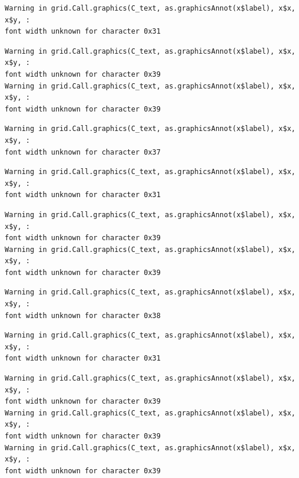 \documentclass[
  letterpaper,
]{scrbook}
\begin{document}
\begin{verbatim}
Warning in grid.Call.graphics(C_text, as.graphicsAnnot(x$label), x$x, x$y, :
font width unknown for character 0x31
\end{verbatim}

\begin{verbatim}
Warning in grid.Call.graphics(C_text, as.graphicsAnnot(x$label), x$x, x$y, :
font width unknown for character 0x39
Warning in grid.Call.graphics(C_text, as.graphicsAnnot(x$label), x$x, x$y, :
font width unknown for character 0x39
\end{verbatim}

\begin{verbatim}
Warning in grid.Call.graphics(C_text, as.graphicsAnnot(x$label), x$x, x$y, :
font width unknown for character 0x37
\end{verbatim}

\begin{verbatim}
Warning in grid.Call.graphics(C_text, as.graphicsAnnot(x$label), x$x, x$y, :
font width unknown for character 0x31
\end{verbatim}

\begin{verbatim}
Warning in grid.Call.graphics(C_text, as.graphicsAnnot(x$label), x$x, x$y, :
font width unknown for character 0x39
Warning in grid.Call.graphics(C_text, as.graphicsAnnot(x$label), x$x, x$y, :
font width unknown for character 0x39
\end{verbatim}

\begin{verbatim}
Warning in grid.Call.graphics(C_text, as.graphicsAnnot(x$label), x$x, x$y, :
font width unknown for character 0x38
\end{verbatim}

\begin{verbatim}
Warning in grid.Call.graphics(C_text, as.graphicsAnnot(x$label), x$x, x$y, :
font width unknown for character 0x31
\end{verbatim}

\begin{verbatim}
Warning in grid.Call.graphics(C_text, as.graphicsAnnot(x$label), x$x, x$y, :
font width unknown for character 0x39
Warning in grid.Call.graphics(C_text, as.graphicsAnnot(x$label), x$x, x$y, :
font width unknown for character 0x39
Warning in grid.Call.graphics(C_text, as.graphicsAnnot(x$label), x$x, x$y, :
font width unknown for character 0x39
\end{verbatim}
\end{document}

